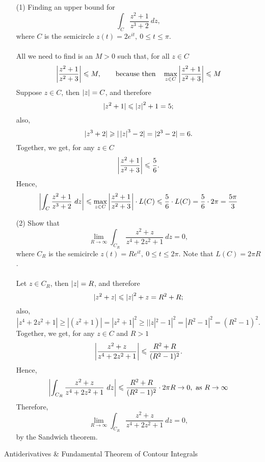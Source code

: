 \vspace*{1em}

\begin{example}\hfill
\begin{itemize}
\item[(1)] Finding an upper bound for
\[\int_C\frac{z^2 + 1}{z^3 + 2}\ dz,\]
where $C$ is the semicircle $z(t) = 2e^{it},\ 0 \leq t \leq \pi$.\\
\\
All we need to find is an $M > 0$ such that, for all $z \in C$
\[\left\lvert\frac{z^2 + 1}{z^2 + 3}\right\rvert \leqslant M,\qquad \text{because then}\quad\max_{z \in C}\left\lvert\frac{z^2 + 1}{z^2 + 3}\right\rvert \leqslant M\]
Suppose $z \in C$, then $\left\lvert z\right\rvert = C$, and therefore
\[|z^2 + 1| \leqslant \left\lvert z\right\rvert^2 + 1 = 5;\]
also,
\[|z^3 + 2| \geqslant |\left\lvert z\right\rvert^3 - 2| = |2^3 - 2| = 6.\]
Together, we get, for any $z \in C$
\[\left\lvert\frac{z^2 + 1}{z^2 + 3}\right\rvert \leqslant \frac{5}{6}.\]
Hence, 
\[\left\lvert\int_C\frac{z^2 + 1}{z^3 + 2}\ dz\right\rvert \leqslant \max_{z \in C}\left\lvert\frac{z^2 + 1}{z^2 + 3}\right\rvert\cdot L(C) \leqslant \frac{5}{6}\cdot L(C) = \frac{5}{6}\cdot 2\pi = \frac{5\pi}{3}\]

\item[(2)] Show that
\[\lim_{R \to \infty}\int_{C_R}\frac{z^2 + z}{z^4 + 2z^2 + 1}\ dz = 0,\]
where $C_R$ is the semicircle $z(t) = Re^{it},\ 0 \leq t \leq 2\pi$. Note that $L(C) = 2\pi R$.\\
\\
Let $z \in C_R$, then $\left\lvert z\right\rvert = R$, and therefore
\[|z^2 + z| \leqslant \left\lvert z\right\rvert^2 + z = R^2 + R;\]
also,
\[|z^4 + 2z^2 + 1| \geq |(z^2 + 1)| = |z^2 + 1|^2 \geq ||z|^2 - 1|^2 = |R^2 - 1|^2 = (R^2 - 1)^2.\]
Together, we get, for any $z \in C$ and $R > 1$
\[\left\lvert\frac{z^2 + z}{z^4 + 2z^2 + 1}\right\rvert \leqslant \frac{R^2 + R}{(R^2 - 1)^2}.\]
Hence, 
\[\abs{\int_{C_R}\frac{z^2 + z}{z^4 + 2z^2 + 1}\ dz} \leq \frac{R^2 + R}{(R^2 - 1)^2}\cdot 2\pi R  \to 0,\ \text{as } R \to \infty\]
Therefore,
\[\lim_{R \to \infty}\int_{C_R}\frac{z^2 + z}{z^4 + 2z^2 + 1}\ dz = 0,\]
by the Sandwich theorem.
\end{itemize}
\end{example}

\vspace*{2em}

\begin{mdframed}
\begin{center}
{\Large Antiderivatives \& Fundamental Theorem of Contour Integrals}
\end{center}
\end{mdframed}

